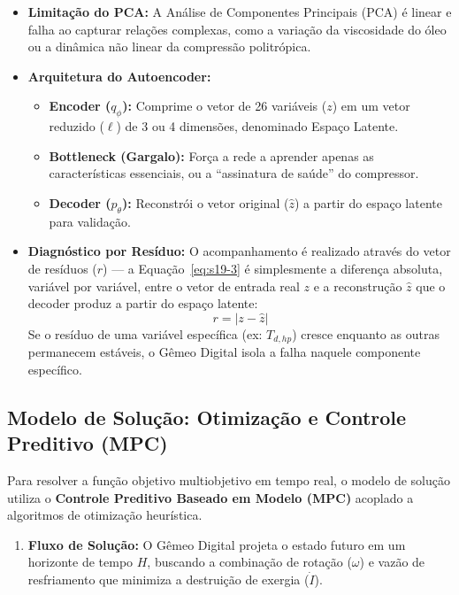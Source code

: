 \documentclass[12pt,a4paper]{article}
\numberwithin{equation}{section}
\numberwithin{table}{section}
\numberwithin{figure}{section}
\begin{document}
{\begin{itemize}
	\item \textbf{Limitação do PCA:} A Análise de Componentes Principais (PCA) é linear e falha ao capturar relações complexas, como a variação da viscosidade do óleo ou a dinâmica não linear da compressão politrópica.
	\item \textbf{Arquitetura do Autoencoder:}
	\begin{itemize}
		\item \textbf{Encoder ($q_{\phi}$):} Comprime o vetor de 26 variáveis ($z$) em um vetor reduzido ($\ell$) de 3 ou 4 dimensões, denominado Espaço Latente.
		\item \textbf{Bottleneck (Gargalo):} Força a rede a aprender apenas as características essenciais, ou a ``assinatura de saúde'' do compressor.
		\item \textbf{Decoder ($p_{\theta}$):} Reconstrói o vetor original ($\hat{z}$) a partir do espaço latente para validação.
	\end{itemize}
	\item \textbf{Diagnóstico por Resíduo:}
	O acompanhamento é realizado através do vetor de resíduos ($r$) — a Equação~\eqref{eq:s19-3} é simplesmente a diferença absoluta, variável por variável, entre o vetor de entrada real $z$ e a reconstrução $\hat{z}$ que o decoder produz a partir do espaço latente:
	\begin{equation}\label{eq:s19-3}
 r = | z - \hat{z} |
\end{equation}
	Se o resíduo de uma variável específica (ex: $T_{d,hp}$) cresce enquanto as outras permanecem estáveis, o Gêmeo Digital isola a falha naquele componente específico.
\end{itemize}

\subsection{Modelo de Solução: Otimização e Controle Preditivo (MPC)}

Para resolver a função objetivo multiobjetivo em tempo real, o modelo de solução utiliza o \textbf{Controle Preditivo Baseado em Modelo (MPC)} acoplado a algoritmos de otimização heurística.

\begin{enumerate}
	\item \textbf{Fluxo de Solução:}
	O Gêmeo Digital projeta o estado futuro em um horizonte de tempo $H$, buscando a combinação de rotação ($\omega$) e vazão de resfriamento que minimiza a destruição de exergia ($\dot{I}$).
	

\end{enumerate}}
\end{document}
